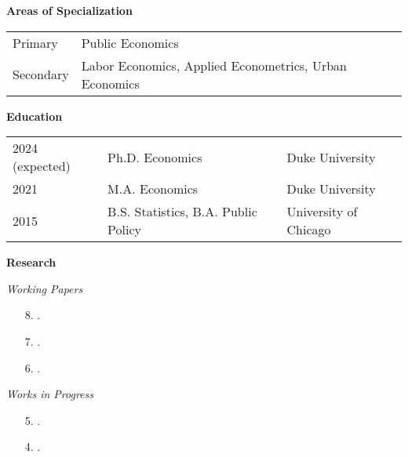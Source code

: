 \documentclass[12pt]{article}
\begin{document}
\renewcommand{\arraystretch}{1.5}

\vspace{1em}

\textbf{Areas of Specialization}

\vspace{1em}

\begin{tabular}{@{}ll}
Primary & Public Economics \\ 
Secondary & Labor Economics, Applied Econometrics, Urban Economics
\end{tabular}

\vspace{1.5em}

\textbf{Education} 

\vspace{1em}

\begin{tabular}{@{}lll}
2024 (expected) & Ph.D. Economics & Duke University \\
2021 & M.A. Economics & Duke University \\
2015 & B.S. Statistics, B.A. Public Policy & University of Chicago \\
\end{tabular}
\vspace{1em}

\textbf{Research}

\vspace{1em}

\textit{Working Papers}

\vspace{1em}

\begin{enumerate}
	\item[8.] . 

	\item[7.] .

	\item[6.] .
\end{enumerate}

\vspace{1em}

\textit{Works in Progress} 

\vspace{1em}

\begin{enumerate}
	\item [5.] .
	\item [4.] .
\end{enumerate}
\end{document}
